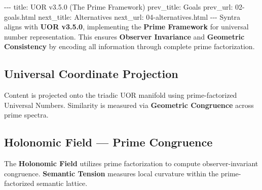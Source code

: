 \documentclass[12pt,a4paper]{article}
\begin{document}
-\/-\/- title: UOR v3.5.0 (The Prime Framework) prev\_title: Goals
prev\_url: 02-goals.html next\_title: Alternatives next\_url:
04-alternatives.html -\/-\/- Syntra aligns with \textbf{UOR v3.5.0},
implementing the \textbf{Prime Framework} for universal number
representation. This ensures \textbf{Observer Invariance} and
\textbf{Geometric Consistency} by encoding all information through
complete prime factorization.

\subsection{Universal Coordinate
Projection}\label{universal-coordinate-projection}

Content is projected onto the triadic UOR manifold using
prime-factorized Universal Numbers. Similarity is measured via
\textbf{Geometric Congruence} across prime spectra.

\begin{Shaded}
\begin{Highlighting}[]
\OperatorTok{=}\NormalTok{)}
\OperatorTok{=}\NormalTok{)}
\NormalTok{(}\NormalTok{, c1[}\NormalTok{])}
\NormalTok{(}\NormalTok{, c2[}\NormalTok{])}
\NormalTok{()}
\OperatorTok{=}
\NormalTok{(}\SpecialCharTok{\{}\NormalTok{)}
\end{Highlighting}
\end{Shaded}

\subsection{Holonomic Field --- Prime
Congruence}\label{holonomic-field-prime-congruence}

The \textbf{Holonomic Field} utilizes prime factorization to compute
observer-invariant congruence. \textbf{Semantic Tension} measures local
curvature within the prime-factorized semantic lattice.
\end{document}
